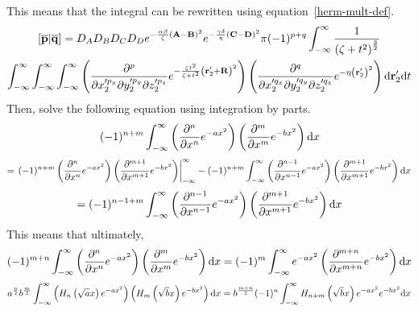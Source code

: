This means that the integral can be rewritten using equation~\ref{herm-mult-def}.
\begin{multline}
  \left[\overline{\mathbf{p}}\middle|\overline{\mathbf{q}}\right] = D_A D_B D_C D_D e^{-\frac{\alpha\beta}{\zeta}\left(\mathbf{A} - \mathbf{B}\right)^2}e^{-\frac{\gamma\delta}{\eta}\left(\mathbf{C} - \mathbf{D}\right)^2}\pi (-1)^{p + q} \int_{-\infty}^\infty\frac{1}{\left(\zeta + t^2\right)^{\frac{3}{2}}} \\
  \int_{-\infty}^\infty\int_{-\infty}^\infty\int_{-\infty}^\infty \left(\frac{\partial^p}{\partial x_2'^{p_x} \partial y_2'^{p_y} \partial z_2'^{p_z}} e^{-\frac{\zeta t^2}{\zeta + t^2}\left(\mathbf{r}_2' + \mathbf{R}\right)^2}\right) \left(\frac{\partial^q}{\partial x_2'^{q_x} \partial y_2'^{q_y} \partial z_2'^{q_z}} e^{-\eta \left(\mathbf{r}_2'\right)^2}\right) \mathrm{d}\mathbf{r}_2' \mathrm{d} t
  \label{fc-herm-int-deriv}
\end{multline}
Then, solve the following equation using integration by parts.
\begin{equation}
  (-1)^{n + m} \int_{-\infty}^\infty \left(\frac{\partial^n}{\partial x^n} e^{-a x^2}\right)\left(\frac{\partial^m}{\partial x^m} e^{-b x^2}\right) \mathrm{d} x
\end{equation}
\begin{equation}
  = \left.(-1)^{n + m}\left(\frac{\partial^n}{\partial x^n} e^{-a x^2}\right)\left(\frac{\partial^{m + 1}}{\partial x^{m + 1}} e^{-b x^2}\right)\right|_{-\infty}^\infty - (-1)^{n + m} \int_{-\infty}^\infty \left(\frac{\partial^{n - 1}}{\partial x^{n - 1}} e^{-a x^2}\right)\left(\frac{\partial^{m + 1}}{\partial x^{m + 1}} e^{-b x^2}\right) \mathrm{d} x
\end{equation}
\begin{equation}
  = (-1)^{n - 1 + m}\int_{-\infty}^\infty \left(\frac{\partial^{n - 1}}{\partial x^{n - 1}} e^{-a x^2}\right)\left(\frac{\partial^{m + 1}}{\partial x^{m + 1}} e^{-b x^2}\right) \mathrm{d} x
\end{equation}
This means that ultimately,
\begin{equation}
  (-1)^{m + n}\int_{-\infty}^\infty \left(\frac{\partial^n}{\partial x^n} e^{-a x^2}\right)\left(\frac{\partial^m}{\partial x^m} e^{-b x^2}\right) \mathrm{d} x = (-1)^m \int_{-\infty}^\infty e^{-ax^2} \left(\frac{\partial^{m + n}}{\partial x^{m + n}} e^{-b x^2}\right) \mathrm{d} x
\end{equation}
\begin{equation}
  a^{\frac{n}{2}}b^{\frac{m}{2}} \int_{-\infty}^\infty \left(H_n\left(\sqrt{a} x\right) e^{-ax^2}\right) \left(H_m\left(\sqrt{b} x\right) e^{-bx^2}\right) \mathrm{d} x = b^{\frac{m + n}{2}} (-1)^{n} \int_{-\infty}^\infty H_{n + m}\left(\sqrt{b} x\right) e^{-a x^2} e^{-b x^2} \mathrm{d} x
  \label{pq-equiv}
\end{equation}
